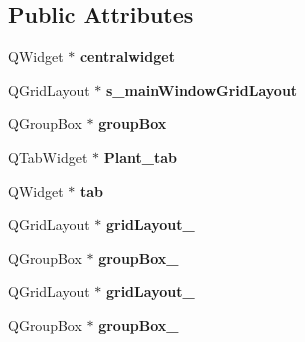 \subsection*{Public Attributes}
\begin{DoxyCompactItemize}
\item 
\hypertarget{classUi__MainWindow_a356f1cf3ebda15f1fac59467ee081b74}{
QWidget $\ast$ {\bfseries centralwidget}}
\label{classUi__MainWindow_a356f1cf3ebda15f1fac59467ee081b74}

\item 
\hypertarget{classUi__MainWindow_ae7902f78acf2ddd14bbda720ac54c450}{
QGridLayout $\ast$ {\bfseries s\_\-mainWindowGridLayout}}
\label{classUi__MainWindow_ae7902f78acf2ddd14bbda720ac54c450}

\item 
\hypertarget{classUi__MainWindow_aef7cb3be8cecfc9aaf98f036a98781ce}{
QGroupBox $\ast$ {\bfseries groupBox}}
\label{classUi__MainWindow_aef7cb3be8cecfc9aaf98f036a98781ce}

\item 
\hypertarget{classUi__MainWindow_af0d287885a083e1f3816cdaf37d6fa3b}{
QTabWidget $\ast$ {\bfseries Plant\_\-tab}}
\label{classUi__MainWindow_af0d287885a083e1f3816cdaf37d6fa3b}

\item 
\hypertarget{classUi__MainWindow_a3efc28c664e9f5115095aafbbc5ac6bc}{
QWidget $\ast$ {\bfseries tab}}
\label{classUi__MainWindow_a3efc28c664e9f5115095aafbbc5ac6bc}

\item 
\hypertarget{classUi__MainWindow_a8ee86315639f324b17708efc7dbe8b19}{
QGridLayout $\ast$ {\bfseries gridLayout\_}}
\label{classUi__MainWindow_a8ee86315639f324b17708efc7dbe8b19}

\item 
\hypertarget{classUi__MainWindow_abb28acde35ffce4d0e6152579df2cbc3}{
QGroupBox $\ast$ {\bfseries groupBox\_}}
\label{classUi__MainWindow_abb28acde35ffce4d0e6152579df2cbc3}

\item 
\hypertarget{classUi__MainWindow_af42ea7d4c2e893181caad21e28166932}{
QGridLayout $\ast$ {\bfseries gridLayout\_}}
\label{classUi__MainWindow_af42ea7d4c2e893181caad21e28166932}

\item 
\hypertarget{classUi__MainWindow_ad8a919e5634add9c41bfc319cb9fd338}{
QGroupBox $\ast$ {\bfseries groupBox\_}}
\label{classUi__MainWindow_ad8a919e5634add9c41bfc319cb9fd338}


\end{DoxyCompactItemize}
